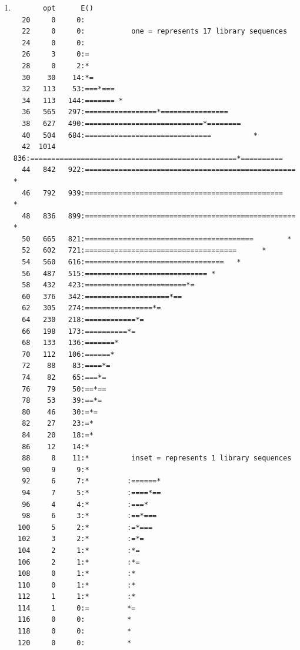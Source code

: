 \documentclass{homework}
\begin{document}
\begin{enumerate}
\begin{enumerate}
\begin{lstlisting}[language=python]
K = 100

f = open('query.fa', 'w')

nukl = ['A','C','G','T']

f.write('> myrandomnukl'+os.linesep)

for i in range(K):
    f.write(random.choice(nukl))
    
f.close()
\end{lstlisting}

\begin{lstlisting}[language=python]
query = open('query.fa', 'r')
db = open('library.fa','r')

query_string = query.readlines()[1][:-1]

count = 0

for line in db:
    if( query_string in line):
        ++count

print (count)

query.close()
db.close()
\end{lstlisting}     

Die Sequenz kommt $0$ mal vor.

\item

\begin{lstlisting}
       opt      E()
  20     0     0:
  22     0     0:           one = represents 17 library sequences
  24     0     0:
  26     3     0:=
  28     0     2:*
  30    30    14:*=
  32   113    53:===*===
  34   113   144:======= *
  36   565   297:=================*================
  38   627   490:============================*========
  40   504   684:==============================          *
  42  1014   836:=================================================*==========
  44   842   922:==================================================    *
  46   792   939:===============================================        *
  48   836   899:==================================================  *
  50   665   821:========================================        *
  52   602   721:====================================      *
  54   560   616:=================================   *
  56   487   515:============================= *
  58   432   423:========================*=
  60   376   342:====================*==
  62   305   274:================*=
  64   230   218:============*=
  66   198   173:==========*=
  68   133   136:=======*
  70   112   106:======*
  72    88    83:====*=
  74    82    65:===*=
  76    79    50:==*==
  78    53    39:==*=
  80    46    30:=*=
  82    27    23:=*
  84    20    18:=*
  86    12    14:*
  88     8    11:*          inset = represents 1 library sequences
  90     9     9:*
  92     6     7:*         :======*
  94     7     5:*         :====*==
  96     4     4:*         :===*
  98     6     3:*         :==*===
 100     5     2:*         :=*===
 102     3     2:*         :=*=
 104     2     1:*         :*=
 106     2     1:*         :*=
 108     0     1:*         :*
 110     0     1:*         :*
 112     1     1:*         :*
 114     1     0:=         *=
 116     0     0:          *
 118     0     0:          *
 120     0     0:          *
\end{lstlisting} 
 

\end{enumerate}
\end{enumerate}
\end{document}
